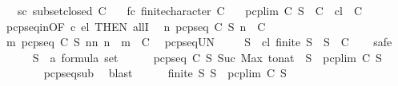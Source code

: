 \begin{isabellebody}
\ \ \ sc{\isacharcolon}\ {\isachardoublequoteopen}subset{\isacharunderscore}closed\ C{\isachardoublequoteclose}\isanewline
\ \ \ fc{\isacharcolon}\ {\isachardoublequoteopen}finite{\isacharunderscore}character\ C{\isachardoublequoteclose}\isanewline
\ \ \ {\isachardoublequoteopen}pcp{\isacharunderscore}lim\ C\ S\ {\isasymin}\ C{\isachardoublequoteclose}\ {\isacharparenleft}\ {\isachardoublequoteopen}{\isacharquery}cl\ {\isasymin}\ C{\isachardoublequoteclose}{\isacharparenright}\isanewline
%
\isadelimproof
%
\endisadelimproof
%
\isatagproof
{}\isamarkupfalse%
\ {\isacharminus}\isanewline
\ \ \isamarkupfalse%
\ pcp{\isacharunderscore}seq{\isacharunderscore}in{\isacharbrackleft}OF\ c\ el{\isacharcomma}\ THEN\ allI{\isacharbrackright}\ \isamarkupfalse%
\ {\isachardoublequoteopen}{\isasymforall}n{\isachardot}\ pcp{\isacharunderscore}seq\ C\ S\ n\ {\isasymin}\ C{\isachardoublequoteclose}\ \isacommand{{\isachardot}}\isamarkupfalse%
\isanewline
\ \ \isamarkupfalse%
\ {\isachardoublequoteopen}{\isasymforall}m{\isachardot}\ {\isasymUnion}{\isacharbraceleft}pcp{\isacharunderscore}seq\ C\ S\ n{\isacharbar}n{\isachardot}\ n\ {\isasymle}\ m{\isacharbraceright}\ {\isasymin}\ C{\isachardoublequoteclose}\ \isamarkupfalse%
\ pcp{\isacharunderscore}seq{\isacharunderscore}UN\ \isacommand{{\isachardot}}\isamarkupfalse%
\isanewline
\ \ \isamarkupfalse%
\ {\isachardoublequoteopen}{\isasymforall}S{\isacharprime}\ {\isasymsubseteq}\ {\isacharquery}cl{\isachardot}\ finite\ S{\isacharprime}\ {\isasymlongrightarrow}\ S{\isacharprime}\ {\isasymin}\ C{\isachardoublequoteclose}\isanewline
\ \ \isamarkupfalse%
\ safe\isanewline
\ \ \ \ \isamarkupfalse%
\ S{\isacharprime}\ {\isacharcolon}{\isacharcolon}\ {\isachardoublequoteopen}{\isacharprime}a\ formula\ set{\isachardoublequoteclose}\isanewline
\ \ \ \ \isamarkupfalse%
\ {\isachardoublequoteopen}pcp{\isacharunderscore}seq\ C\ S\ {\isacharparenleft}Suc\ {\isacharparenleft}Max\ {\isacharparenleft}to{\isacharunderscore}nat\ {\isacharbackquote}\ S{\isacharprime}{\isacharparenright}{\isacharparenright}{\isacharparenright}\ {\isasymsubseteq}\ pcp{\isacharunderscore}lim\ C\ S{\isachardoublequoteclose}\ \isanewline
\ \ \ \ \ \ \isamarkupfalse%
\ pcp{\isacharunderscore}seq{\isacharunderscore}sub\ \isamarkupfalse%
\ blast\isanewline
\ \ \ \ \isamarkupfalse%
\ {\isacartoucheopen}finite\ S{\isacharprime}{\isacartoucheclose}\ {\isacartoucheopen}S{\isacharprime}\ {\isasymsubseteq}\ pcp{\isacharunderscore}lim\ C\ S{\isacartoucheclose}\isanewline

\end{isabellebody}

